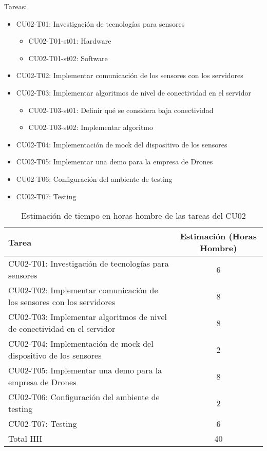 Tareas: 
\begin{itemize}

\item CU02-T01: Investigación de tecnologías para sensores
\begin{itemize}
\item CU02-T01-st01: Hardware
\item CU02-T01-st02: Software
\end{itemize}

\item CU02-T02: Implementar comunicación de los sensores con los servidores

\item CU02-T03: Implementar algoritmos de nivel de conectividad en el servidor 
\begin{itemize}
\item CU02-T03-st01: Definir qué se considera baja conectividad
\item CU02-T03-st02: Implementar algoritmo
\end{itemize}

\item CU02-T04: Implementación de mock del dispositivo de los sensores
\item CU02-T05: Implementar una demo para la empresa de Drones
\item CU02-T06: Configuración del ambiente de testing
\item CU02-T07: Testing

\end{itemize}

\begin{table}[htb]
\begin{center}
\begin{tabular}{|l|c|}
\hline
Tarea & Estimación (Horas Hombre) \\
\hline \hline
CU02-T01: Investigación de tecnologías para sensores & 6 \\ \hline
CU02-T02: Implementar comunicación de los sensores con los servidores & 8 \\ \hline
CU02-T03: Implementar algoritmos de nivel de conectividad en el servidor & 8 \\ \hline
CU02-T04: Implementación de mock del dispositivo de los sensores & 2 \\ \hline
CU02-T05: Implementar una demo para la empresa de Drones & 8 \\ \hline
CU02-T06: Configuración del ambiente de testing & 2 \\ \hline
CU02-T07: Testing & 6 \\ \hline
Total HH & 40 \\ \hline
\end{tabular}
\caption{Estimación de tiempo en horas hombre de las tareas del CU02}
\label{tabla:sencilla}
\end{center}
\end{table}

